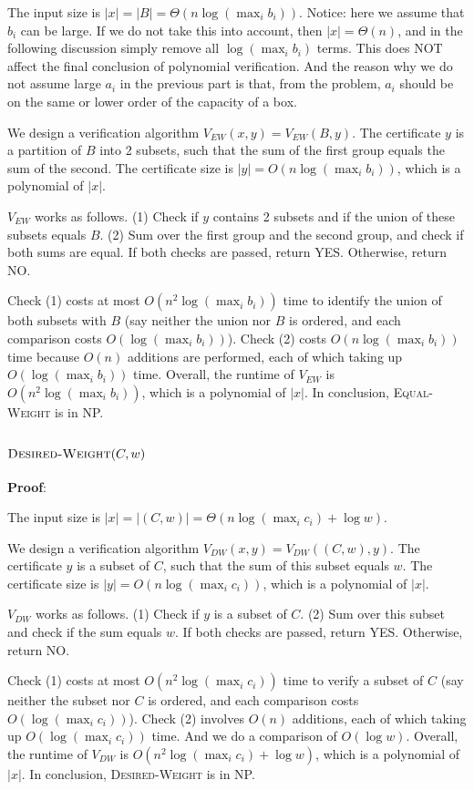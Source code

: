 \documentclass{article}
\begin{document}
The input size is $|x|=|B|=\Theta(n\log(\max_ib_i))$. Notice: here we assume that $b_i$ can be large. If we do not take this into account, then $|x|=\Theta(n)$, and in the following discussion simply remove all $\log(\max_ib_i)$ terms. This does NOT affect the final conclusion of polynomial verification. And the reason why we do not assume large $a_i$ in the previous part is that, from the problem, $a_i$ should be on the same or lower order of the capacity of a box.

We design a verification algorithm $V_{EW}(x,y)=V_{EW}(B,y)$. The certificate $y$ is a partition of $B$ into 2 subsets, such that the sum of the first group equals the sum of the second. The certificate size is $|y|=O(n\log(\max_ib_i))$, which is a polynomial of $|x|$.

$V_{EW}$ works as follows. (1) Check if $y$ contains 2 subsets and if the union of these subsets equals $B$. (2) Sum over the first group and the second group, and check if both sums are equal. If both checks are passed, return YES. Otherwise, return NO.

Check (1) costs at most $O(n^2\log(\max_ib_i))$ time to identify the union of both subsets with $B$ (say neither the union nor $B$ is ordered, and each comparison costs $O(\log(\max_ib_i))$). Check (2) costs $O(n\log(\max_ib_i))$ time because $O(n)$ additions are performed, each of which taking up $O(\log(\max_ib_i))$ time. Overall, the runtime of $V_{EW}$ is $O(n^2\log(\max_ib_i))$, which is a polynomial of $|x|$. In conclusion, \textsc{Equal-Weight} is in NP.

\subsubsection{$\textsc{Desired-Weight}(C,w)$}
\noindent\textbf{Proof}:

The input size is $|x|=|(C,w)|=\Theta(n\log(\max_ic_i)+\log w)$.

We design a verification algorithm $V_{DW}(x,y)=V_{DW}((C,w),y)$. The certificate $y$ is a subset of $C$, such that the sum of this subset equals $w$. The certificate size is $|y|=O(n\log(\max_ic_i))$, which is a polynomial of $|x|$.

$V_{DW}$ works as follows. (1) Check if $y$ is a subset of $C$. (2) Sum over this subset and check if the sum equals $w$. If both checks are passed, return YES. Otherwise, return NO.

Check (1) costs at most $O(n^2\log(\max_ic_i))$ time to verify a subset of $C$ (say neither the subset nor $C$ is ordered, and each comparison costs $O(\log(\max_ic_i))$). Check (2) involves $O(n)$ additions, each of which taking up $O(\log(\max_ic_i))$ time. And we do a comparison of $O(\log w)$. Overall, the runtime of $V_{DW}$ is $O(n^2\log(\max_ic_i)+\log w)$, which is a polynomial of $|x|$. In conclusion, \textsc{Desired-Weight} is in NP.
\end{document}
